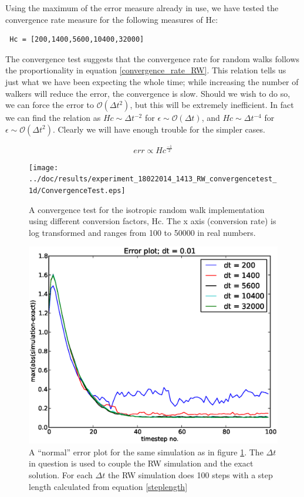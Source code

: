 Using the maximum of the error measure already in use, we have tested the convergence rate measure for the following measures of Hc:
\begin{lstlisting}
 Hc = [200,1400,5600,10400,32000]
\end{lstlisting}
The convergence test suggests that the convergence rate for random walks follows the proportionality in equation \ref{convergence_rate_RW}. 
This relation tells us just what we have been expecting the whole time; while increasing the number of walkers will reduce the error, the convergence is slow. 
Should we wish to do so, we can force the error to $\mathcal{O}(\Delta t^2)$, but this will be extremely inefficient. In fact we can find the relation as $Hc\sim\Delta t^{-2}$ for $\epsilon\sim\mathcal{O}(\Delta t)$, and $Hc\sim\Delta t^{-4}$ for $\epsilon\sim\mathcal{O}(\Delta t^2)$. Clearly we will have enough trouble for the simpler cases.

\begin{equation}\label{convergence_rate_RW}
err \propto Hc^{\frac{-1}{2}}
\end{equation}


\begin{figure}[H]
 \centering
 \texttt{[image: ../doc/results/experiment\_18022014\_1413\_RW\_convergencetest\_1d/ConvergenceTest.eps]}
 \caption[Convergence test RW]{A convergence test for the isotropic random walk implementation using different conversion factors, Hc. The x axis (conversion rate) is log transformed and ranges from 100 to 50000 in real numbers.}
 \label{ConvergenceTestRW}
\end{figure}
\begin{figure}[H]
 \centering
 \includegraphics[scale=0.7]{../doc/results/experiment_18022014_1413_RW_convergencetest_1d/results/errorplot.eps}
 \caption[Error plot RW]{A ``normal'' error plot for the same simulation as in figure \ref{ConvergenceTestRW}. The $\Delta t$ in question is used to couple the RW simulation and the exact solution. For each $\Delta t$ the RW simulation does 100 steps with a step length calculated from equation \ref{steplength}}
\end{figure}





